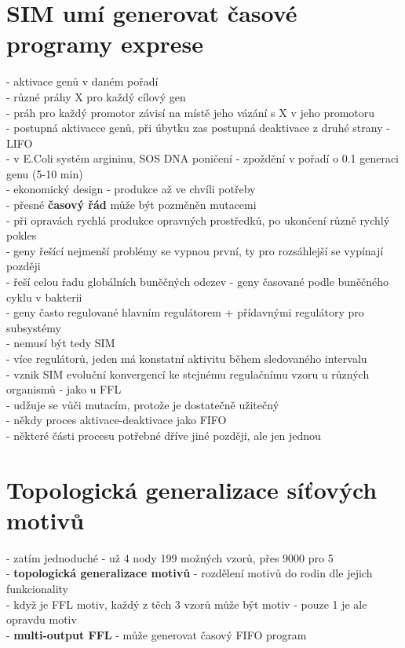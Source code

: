 \documentclass[11pt,a4paper]{report}
\begin{document}
\section{SIM umí generovat časové programy exprese}
- aktivace genů v daném pořadí\\
- různé práhy X pro každý cílový gen\\
\indent - práh pro každý promotor závisí na místě jeho vázání s X v jeho promotoru\\
- postupná aktivacce genů, při úbytku zas postupná deaktivace z druhé strany - LIFO\\
- v E.Coli systém argininu, SOS DNA poničení - zpoždění v pořadí o 0.1 generaci genu (5-10 min)\\
- ekonomický design - produkce až ve chvíli potřeby\\
- přesné \textbf{časový řád} může být pozměněn mutacemi\\ 
\indent - při opravách rychlá produkce opravných prostředků, po ukončení různě rychlý pokles\\
\indent \indent - geny řešící nejmenší problémy se vypnou první, ty pro rozsáhlejší se vypínají později\\
\indent - řeší celou řadu globálních buněčných odezev - geny časované podle buněčného cyklu v bakterii\\
\indent - geny často regulované hlavním regulátorem + přídavnými regulátory pro subsystémy\\
\indent \indent - nemusí být tedy SIM\\
\indent - více regulátorů, jeden má konstatní aktivitu během sledovaného intervalu\\
- vznik SIM evoluční konvergencí ke stejnému regulačnímu vzoru u různých organismů - jako u FFL\\
- udžuje se vůči mutacím, protože je dostatečně užitečný\\
- někdy proces aktivace-deaktivace jako FIFO\\
\indent - některé části procesu potřebné dříve jiné později, ale jen jednou\\

\section{Topologická generalizace síťových motivů}
- zatím jednoduché - už 4 nody 199 možných vzorů, přes 9000 pro 5\\
- \textbf{topologická generalizace motivů} - rozdělení motivů do rodin dle jejich funkcionality\\
\indent - když je FFL motiv, každý z těch 3 vzorů může být motiv - pouze 1 je ale opravdu motiv\\
\indent \indent - \textbf{multi-output FFL} - může generovat časový FIFO program\\
\end{document}
